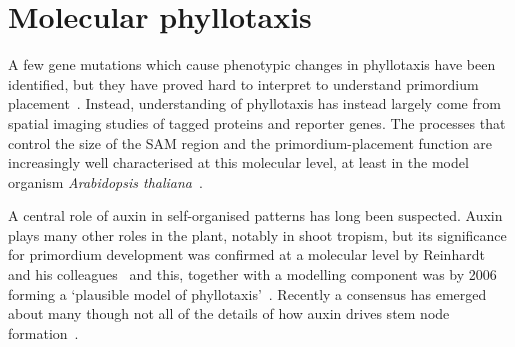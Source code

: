 
\section{Molecular phyllotaxis}

A few gene mutations which cause phenotypic changes in phyllotaxis have been identified, but they have proved hard to interpret to understand primordium placement~\cite{kuhlemeierPhyllotaxis2017}. Instead,  understanding of phyllotaxis has instead largely come from spatial imaging studies of tagged proteins and  reporter genes. The processes that control the size of the SAM region and the primordium-placement function are increasingly well characterised at this molecular level, at least in the model organism \textit{Arabidopsis thaliana}~\cite{galvan-ampudiaTemporalIntegrationAuxin2020,cronkMolecularOrganographyPlants2009}.

 A central role of auxin in self-organised patterns has long been suspected.  Auxin plays many other roles in the plant, notably in shoot tropism, but its significance for primordium development was confirmed at a molecular level by Reinhardt and his colleagues~\autocite{reinhardtRegulationPhyllotaxisPolar2003} and this, together with a modelling component was by 2006 forming a `plausible model of phyllotaxis'~\cite{smithPlausibleModelPhyllotaxis2006}. Recently a consensus has emerged about many though not all of the details of how auxin drives stem node formation~\autocite{shiPatterningShootApical2019}.

